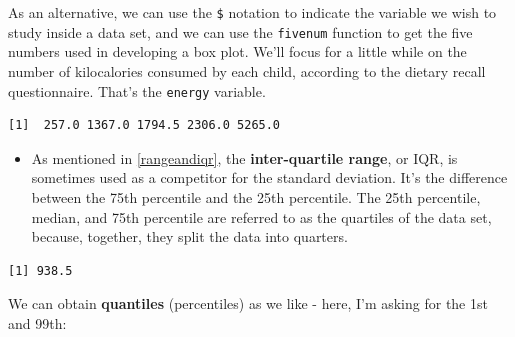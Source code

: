 \documentclass[
]{book}
\newenvironment{Shaded}{\begin{snugshade}}{\end{snugshade}}
\newcommand{\DataTypeTok}[1]{\textcolor[rgb]{0.13,0.29,0.53}{#1}}
\newcommand{\FloatTok}[1]{\textcolor[rgb]{0.00,0.00,0.81}{#1}}
\newcommand{\KeywordTok}[1]{\textcolor[rgb]{0.13,0.29,0.53}{\textbf{#1}}}
\newcommand{\NormalTok}[1]{#1}
\newcommand{\OperatorTok}[1]{\textcolor[rgb]{0.81,0.36,0.00}{\textbf{#1}}}
\providecommand{\tightlist}{%
  \setlength{\itemsep}{0pt}\setlength{\parskip}{0pt}}
\begin{document}
As an alternative, we can use the \texttt{\$} notation to indicate the variable we wish to study inside a data set, and we can use the \texttt{fivenum} function to get the five numbers used in developing a box plot. We'll focus for a little while on the number of kilocalories consumed by each child, according to the dietary recall questionnaire. That's the \texttt{energy} variable.

\begin{Shaded}
\end{Shaded}

\begin{verbatim}
[1]  257.0 1367.0 1794.5 2306.0 5265.0
\end{verbatim}

\begin{itemize}
\tightlist
\item
  As mentioned in \ref{rangeandiqr}, the \textbf{inter-quartile range}, or IQR, is sometimes used as a competitor for the standard deviation. It's the difference between the 75th percentile and the 25th percentile. The 25th percentile, median, and 75th percentile are referred to as the quartiles of the data set, because, together, they split the data into quarters.
\end{itemize}

\begin{Shaded}
\end{Shaded}

\begin{verbatim}
[1] 938.5
\end{verbatim}

We can obtain \textbf{quantiles} (percentiles) as we like - here, I'm asking for the 1st and 99th:

\begin{Shaded}
\end{Shaded}
\end{document}
